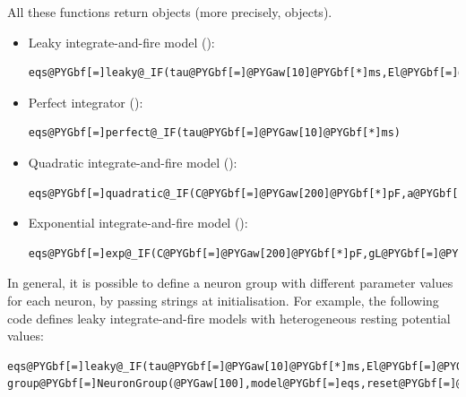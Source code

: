 \documentclass[letterpaper,10pt,english]{manual}
\begin{document}
All these functions return \hyperlink{brian.Equations}{} objects (more precisely,  objects).
\begin{itemize}
\item {} 
Leaky integrate-and-fire model ():

\begin{Verbatim}[commandchars=@\[\]]
eqs@PYGbf[=]leaky@_IF(tau@PYGbf[=]@PYGaw[10]@PYGbf[*]ms,El@PYGbf[=]@PYGbf[-]@PYGaw[70]@PYGbf[*]mV)
\end{Verbatim}

\item {} 
Perfect integrator ():

\begin{Verbatim}[commandchars=@\[\]]
eqs@PYGbf[=]perfect@_IF(tau@PYGbf[=]@PYGaw[10]@PYGbf[*]ms)
\end{Verbatim}

\item {} 
Quadratic integrate-and-fire model ():

\begin{Verbatim}[commandchars=@\[\]]
eqs@PYGbf[=]quadratic@_IF(C@PYGbf[=]@PYGaw[200]@PYGbf[*]pF,a@PYGbf[=]@PYGaw[10]@PYGbf[*]nS@PYGbf[/]mV,EL@PYGbf[=]@PYGbf[-]@PYGaw[70]@PYGbf[*]mV,VT@PYGbf[=]@PYGbf[-]@PYGaw[50]@PYGbf[*]mV)
\end{Verbatim}

\item {} 
Exponential integrate-and-fire model ():

\begin{Verbatim}[commandchars=@\[\]]
eqs@PYGbf[=]exp@_IF(C@PYGbf[=]@PYGaw[200]@PYGbf[*]pF,gL@PYGbf[=]@PYGaw[10]@PYGbf[*]nS,EL@PYGbf[=]@PYGbf[-]@PYGaw[70]@PYGbf[*]mV,VT@PYGbf[=]@PYGbf[-]@PYGaw[55]@PYGbf[*]mV,DeltaT@PYGbf[=]@PYGaw[3]@PYGbf[*]mV)
\end{Verbatim}

\end{itemize}

In general, it is possible to define a neuron group with different parameter values for each neuron, by
passing strings at initialisation. For example, the following code defines leaky integrate-and-fire models
with heterogeneous resting potential values:

\begin{Verbatim}[commandchars=@\[\]]
eqs@PYGbf[=]leaky@_IF(tau@PYGbf[=]@PYGaw[10]@PYGbf[*]ms,El@PYGbf[=]@PYGad[']@PYGad[V0]@PYGad['])@PYGbf[+]Equations(@PYGad[']@PYGad[V0:volt]@PYGad['])
group@PYGbf[=]NeuronGroup(@PYGaw[100],model@PYGbf[=]eqs,reset@PYGbf[=]@PYGaw[0]@PYGbf[*]mV,threshold@PYGbf[=]@PYGaw[15]@PYGbf[*]mV)
\end{Verbatim}
\end{document}
